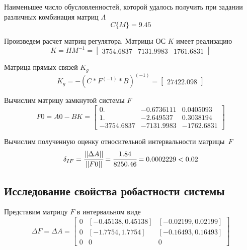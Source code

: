 Наименьшее число обусловленностей, которой удалось получить при задании различных комбинация матриц $\Lambda$
\begin{equation}
	C\{M\} = 9.45
\end{equation}

Произведем расчет матриц регулятора. Матрицы ОС $K$ имеет реализацию
\begin{equation}
	K = H M^{-1} = 
	\begin{bmatrix}
	3754.6837 &   7131.9983   & 1761.6831
	\end{bmatrix}
\end{equation}

Матрица прямых связей $K_g$
\begin{equation}
	K_g = -(C * F^(-1) * B)^(-1) =
	\begin{bmatrix}
		27422.098 
	\end{bmatrix}
\end{equation}

Вычислим матрицу замкнутой системы $F$ 
\begin{equation}
	F0 = A0 - B K =
	\begin{bmatrix}
	    0.&        - 0.6736111 &   0.0405093  \\
		1. &        - 2.649537  &   0.3038194  \\
		- 3754.6837 & - 7131.9983 & - 1762.6831 
	\end{bmatrix}
\end{equation}

Вычислим полученную оценку относительной интервальности матрицы~$F$
\begin{equation}
	\delta_{IF} = \cfrac{||\Delta A||}{||F0||} = \cfrac{1.84}{8250.46} = 0.0002229 < 0.02
\end{equation}

\subsection{Исследование свойства робастности системы}
Представим матрицу $F$ в интервальном виде
\begin{equation}
	\Delta F = \Delta A = 
	\begin{bmatrix}
		0  &[- 0.45138, 0.45138] &  [- 0.02199, 0.02199]\\  
		0  &[- 1.7754, 1.7754] &   [- 0.16493, 0.16493]  \\
		0  &  0     &      0         
	\end{bmatrix}
\end{equation}


